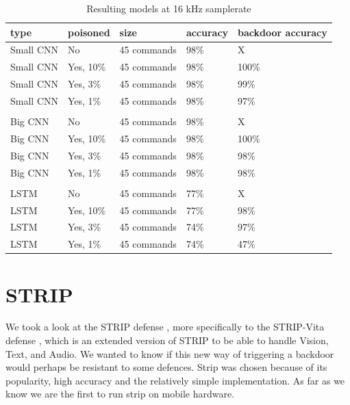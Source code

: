 \documentclass{report}
\theoremstyle{definition}
\theoremstyle{remark}
\begin{document}
\begin{table}[!hbt]
\centering
\begin{tabular}{|l|l|l|l|l|}
\hline
type & poisoned & size & accuracy &   backdoor accuracy \\ \hline
Small CNN & No  &  45 commands  &   98\%  & X     \\ \hline
Small CNN & Yes, 10\%  &  45 commands  &  98\% & 100\%        \\ \hline
Small CNN & Yes, 3\%  &  45 commands  &  98\%  & 99\%     \\ \hline
Small CNN & Yes, 1\%  &  45 commands  &  98\%  & 97\%     \\ \hline
 &  &  &  &  \\ \hline
Big CNN & No  &  45 commands  &   98\%  & X     \\ \hline
Big CNN & Yes, 10\%  &  45 commands  &  98\% & 100\%        \\ \hline
Big CNN & Yes, 3\%  &  45 commands  &  98\%  & 98\%     \\ \hline
Big CNN & Yes, 1\%  &  45 commands  &  98\%  & 98\%     \\ \hline
 &  &  &  &  \\ \hline
LSTM & No  &  45 commands  &   77\%  & X     \\ \hline
LSTM & Yes, 10\%  &  45 commands  &  77\% & 98\%        \\ \hline
LSTM & Yes, 3\%  &  45 commands  &  74\%  & 97\%     \\ \hline
LSTM & Yes, 1\%  &  45 commands  &  74\%  & 47\%     \\ \hline
\end{tabular}
\caption{Resulting models at 16 kHz samplerate}
\label{tab:speaker_reg}
\end{table}

\section{STRIP \label{STRIP}}
We took a look at the STRIP defense \cite{Strip}, more specifically to the STRIP-Vita defense \cite{StripVita}, which is an extended version of STRIP to be able to handle Vision, Text, and Audio. We wanted to know if this new way of triggering a backdoor would perhaps be resistant to some defences. Strip was chosen because of its popularity, high accuracy and the relatively simple implementation. As far as we know we are the first to run strip on mobile hardware.
\end{document}
